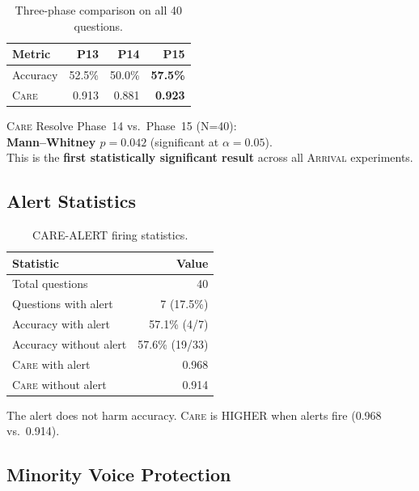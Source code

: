 \documentclass[11pt,a4paper]{article}
\newcommand{\arrival}{\textsc{Arrival}\xspace}
\newcommand{\care}{\textsc{Care}\xspace}
\begin{document}
\begin{table}[H]
\centering\small
\caption{Three-phase comparison on all 40 questions.}\label{tab:p15all}
\begin{tabular}{@{}lrrr@{}}
\toprule
\textbf{Metric} & \textbf{P13} & \textbf{P14} & \textbf{P15} \\
\midrule
Accuracy & 52.5\% & 50.0\% & \textbf{57.5\%} \\
\care    & 0.913  & 0.881  & \textbf{0.923} \\
\bottomrule
\end{tabular}
\end{table}

\begin{resultbox}
\care Resolve Phase~14 vs.\ Phase~15 (N=40):\\
\textbf{Mann--Whitney $p = 0.042$} (significant at $\alpha = 0.05$).\\
This is the \textbf{first statistically significant result} across all
\arrival experiments.
\end{resultbox}

\subsection{Alert Statistics}

\begin{table}[H]
\centering\small
\caption{CARE-ALERT firing statistics.}\label{tab:alerts}
\begin{tabular}{@{}lr@{}}
\toprule
\textbf{Statistic} & \textbf{Value} \\
\midrule
Total questions            & 40 \\
Questions with alert       & 7 (17.5\%) \\
Accuracy with alert        & 57.1\% (4/7) \\
Accuracy without alert     & 57.6\% (19/33) \\
\care with alert           & 0.968 \\
\care without alert        & 0.914 \\
\bottomrule
\end{tabular}
\end{table}

The alert does not harm accuracy.  \care is HIGHER when alerts fire
(0.968 vs.\ 0.914).

\subsection{Minority Voice Protection}
\end{document}
